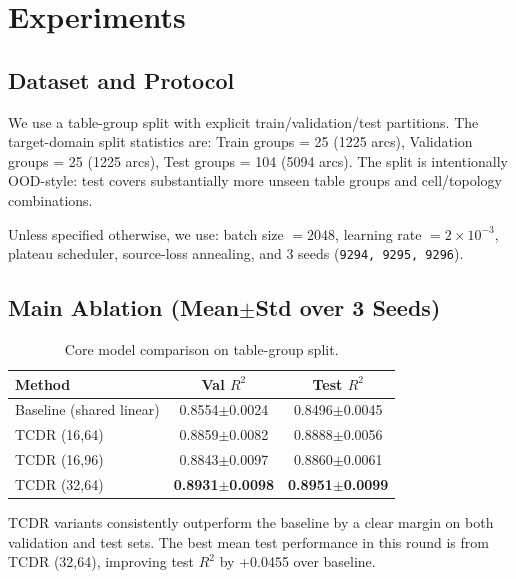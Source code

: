 \section{Experiments}
\label{sec:results}

\subsection{Dataset and Protocol}
We use a table-group split with explicit train/validation/test partitions.
The target-domain split statistics are:
Train groups = 25 (1225 arcs), Validation groups = 25 (1225 arcs), Test groups = 104 (5094 arcs).
The split is intentionally OOD-style: test covers substantially more unseen table groups and cell/topology combinations.

Unless specified otherwise, we use:
batch size $=2048$, learning rate $=2\times 10^{-3}$, plateau scheduler, source-loss annealing, and 3 seeds
(\texttt{9294, 9295, 9296}).

\subsection{Main Ablation (Mean$\pm$Std over 3 Seeds)}
\begin{table}[htbp]
\centering
\small
\setlength{\tabcolsep}{4pt}
\begin{tabular}{lcc}
\toprule
Method & Val $R^2$ & Test $R^2$ \\
\midrule
Baseline (shared linear) & 0.8554$\pm$0.0024 & 0.8496$\pm$0.0045 \\
TCDR (16,64) & 0.8859$\pm$0.0082 & 0.8888$\pm$0.0056 \\
TCDR (16,96) & 0.8843$\pm$0.0097 & 0.8860$\pm$0.0061 \\
TCDR (32,64) & \textbf{0.8931$\pm$0.0098} & \textbf{0.8951$\pm$0.0099} \\
\bottomrule
\end{tabular}
\caption{Core model comparison on table-group split.}
\label{tab:core_ablation}
\end{table}

TCDR variants consistently outperform the baseline by a clear margin on both validation and test sets.
The best mean test performance in this round is from TCDR (32,64), improving test $R^2$ by +0.0455 over baseline.

